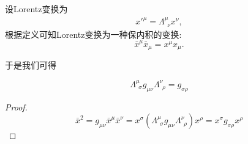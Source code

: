 设Lorentz变换为
\begin{align}
    x'^\mu=\Lambda^\mu_{~~\nu}x^\nu,
\end{align}
根据定义可知Lorentz变换为一种保内积的变换:
\begin{equation}
    \bar x^\mu\bar x_\mu=x^\mu x_\mu.
\end{equation}

于是我们可得
\begin{theorem}[Lorentz变换的性质]\label{theorem:lorentz_property}
    \begin{equation}
        \Lambda^\mu_{~~\sigma}g_{\mu\nu}\Lambda^\nu_{~~\rho}=g_{\sigma\rho}
    \end{equation}
\end{theorem}
\begin{proof}
    \begin{equation}
        \bar{x}^2=g_{\mu\nu}\bar{x}^\mu\bar x^\nu=x^\sigma(\Lambda^\mu_{~~\sigma}g_{\mu\nu}\Lambda^\nu_{~~\rho})x^\rho=x^\sigma g_{\sigma\rho} x^\rho
    \end{equation}
\end{proof}

